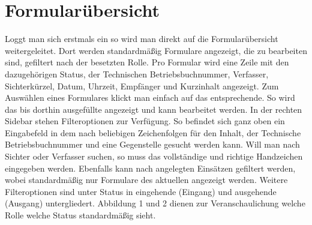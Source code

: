 \documentclass[a4paper,11pt,oneside, titlepage]{article}
\begin{document}
	\section{Formularübersicht}
	Loggt man sich erstmals ein so wird man direkt auf die Formularübersicht weitergeleitet. Dort werden standardmäßig Formulare angezeigt, die zu bearbeiten sind, gefiltert nach der besetzten Rolle.
	Pro Formular wird eine Zeile mit den dazugehörigen Status, der Technischen Betriebsbuchnummer, Verfasser, Sichterkürzel, Datum, Uhrzeit, Empfänger und Kurzinhalt angezeigt. Zum Auswählen eines Formulares klickt man einfach auf das entsprechende. So wird das bis dorthin ausgefüllte angezeigt und kann bearbeitet werden.
	\newline
	\newline
	In der rechten Sidebar stehen Filteroptionen zur Verfügung. So befindet sich ganz oben ein Eingabefeld in dem nach beliebigen Zeichenfolgen für den Inhalt, der Technische Betriebsbuchnummer und eine Gegenstelle gesucht werden kann. Will man nach Sichter oder Verfasser suchen, so muss das vollständige und richtige Handzeichen eingegeben werden. Ebenfalls kann nach angelegten Einsätzen gefiltert werden, wobei standardmäßig nur Formulare des aktuellen angezeigt werden.
	\newline
	Weitere Filteroptionen sind unter \glqq{}Status \grqq{} in eingehende (\glqq{}Eingang\grqq{}) und ausgehende (\glqq{}Ausgang\grqq{}) untergliedert. Abbildung 1 und 2 dienen zur Veranschaulichung welche Rolle welche Status standardmäßig sieht. 
\end{document}
